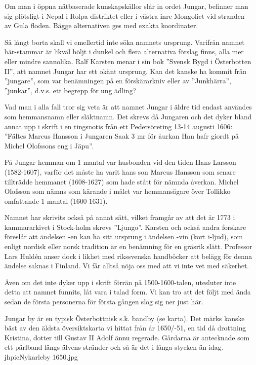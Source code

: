 

Om man i öppna nätbaserade kunskapskällor slår in ordet Jungar, befinner man sig plötsligt i Nepal i Rolpa-distriktet eller  i västra inre Mongoliet vid stranden av Gula floden. Bägge alternativen ges med exakta koordinater.

Så långt borta skall vi emellertid inte söka namnets ursprung. Varifrån namnet här-stammar är likväl höljt i dunkel och flera alternativa förslag finns, alla mer eller mindre sannolika. Ralf Karsten menar i sin bok ”Svensk Bygd i Österbotten II”, att namnet Jungar har ett okänt ursprung. Kan det kanske ha kommit från ”jungare”, som var benämningen på en förskärarkniv eller av ”Junkhärra”, ”junkar”, d.v.s. ett begrepp för ung ädling?

Vad man i alla fall tror sig veta är att namnet Jungar i äldre tid endast användes som hemmansnamn eller släktnamn. Det skrevs då Jungaren och det dyker bland annat upp i skrift i en tingsnotis från ett Pedersöreting 13-14 augusti 1606: ”Fältes Marcus Hansson i Jungaren Saak 3 mr för åurkan Han hafr giordt på Michel Olofssons eng i Jäpu”.

På Jungar hemman om 1 mantal var husbonden vid den tiden Hans Larsson (1582-1607), varför det måste ha varit hans son Marcus Hansson som senare tillträdde hemmanet (1608-1627) som hade stått för nämnda åverkan. Michel Olofsson som nämns som kärande i målet var hemmansägare över Tollikko omfattande 1 mantal (1600-1631).

Namnet har skrivits också på annat sätt, vilket framgår av att det år 1773 i kammararkivet i Stock-holm skrevs ”Ljungo”. Karsten och också andra forskare föreslår att ändelsen -en kan ha sitt ursprung i ändelsen -vin (kort i-ljud), som enligt nordisk eller norsk tradition är en benämning för en gräsrik slätt. Professor Lars Huldén anser dock i likhet med rikssvenska handböcker att belägg för denna ändelse saknas i Finland. Vi får alltså nöja oss med att vi inte vet med säkerhet.

Även om det inte dyker upp i skrift förrän på 1500-1600-talen, utesluter inte detta att namnet funnits, låt vara i talad form. Vi kan tro att det följt med ända sedan de första personerna för första gången slog sig ner just här.


Jungar by är en typisk Österbottnisk s.k. bandby (se karta). Det märks kanske bäst av den äldsta översiktskarta vi hittat från år 1650/-51, en tid då drottning Kristina, dotter till Gustav II Adolf ännu regerade. Gårdarna är antecknade som ett pärlband längs älvens stränder och så är det i långa stycken än idag. jhpic{Nykarleby 1650.jpg}

